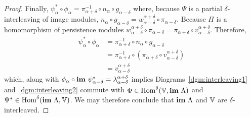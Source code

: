 \begin{proof}
  Finally, $\psi_\alpha^*\circ\phi_\alpha = \pi_{\alpha+\delta}^{-1}\circ n_\alpha\circ g_{\alpha-\delta}$ where, because $\Psi$ is a partial $\delta$-interleaving of image modules, $n_\alpha\circ g_{\alpha-\delta} = w_{\alpha-\delta}^{\alpha+\delta}\circ\pi_{\alpha-\delta}$.
  Because $\Pi$ is a homomorphism of persistence modules $w_{\alpha-\delta}^{\alpha+\delta}\circ \pi_{\alpha-\delta} = \pi_{\alpha+\delta}\circ v_{\alpha-\delta}^{\alpha+\delta}$.
  Therefore,
  \begin{align*}
    \psi_\alpha^*\circ\phi_\alpha &= \pi_{\alpha+\delta}^{-1}\circ n_\alpha\circ g_{\alpha-\delta}\\
      &= \pi_{\alpha+\delta}^{-1}\circ (\pi_{\alpha+\delta}\circ v_{\alpha-\delta}^{\alpha+\delta})\\
      &= v_{\alpha-\delta}^{\alpha+\delta}
  \end{align*}
  which, along with $\phi_\alpha\circ\mathbf{im}~\psi_{\alpha-\delta}^* = \lambda_{\alpha-\delta}^{\alpha+\delta}$ implies Diagrams~\ref{dgm:interleaving1} and~\ref{dgm:interleaving2} commute with $\Phi\in\mathrm{Hom}^\delta(\mathbb{V},\mathbf{im}~\Lambda)$ and $\Psi^*\in\mathrm{Hom}^\delta(\mathbf{im}~\Lambda, \mathbb{V})$.
  We may therefore conclude that $\mathbf{im}~\Lambda$ and $\mathbb{V}$ are $\delta$-interleaved.

\end{proof}
